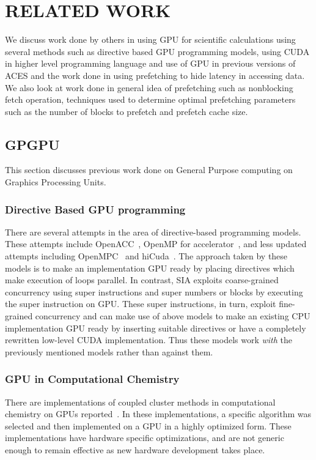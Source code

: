 \chapter{RELATED WORK}\label{lit}

We discuss work done by others in using GPU for scientific calculations using
several methods such as directive based GPU programming models, using CUDA in
higher level programming language and use of GPU in previous versions of ACES
and the work done in using prefetching to hide latency in accessing data. We also look
at work done in general idea of prefetching such as nonblocking fetch operation,
techniques used to determine optimal prefetching parameters such as the number of
blocks to prefetch and prefetch cache size.

\section{GPGPU}
This section discusses previous work done on General Purpose computing on Graphics
Processing Units.

\subsection{Directive Based GPU programming}
There are several attempts in the area of directive-based programming models. These
attempts include OpenACC~\cite{openacc}, OpenMP for
accelerator~\cite{openmpforaccelerators}, and less updated attempts including
OpenMPC~\cite{openmpc} and hiCuda~\cite{hicuda}. The approach taken by these models
is to make an implementation GPU ready by placing directives which make
execution of loops parallel. In contrast, SIA exploits coarse-grained
concurrency using super instructions and super numbers or blocks by executing
the super instruction on GPU. These super instructions, in turn, exploit fine-grained
concurrency and can make use of above models to make an existing CPU implementation
GPU ready by inserting suitable directives or have a completely rewritten low-level
CUDA implementation. Thus these models work \textit{with} the previously mentioned
models rather than against them.

\subsection{GPU in Computational Chemistry}
There are implementations of coupled cluster methods in computational chemistry
on GPUs reported~\cite{bhaskar2013}\cite{deprince2011}\cite{maw2011}. In these
implementations, a specific algorithm was selected and then implemented on a
GPU in a highly optimized form. These implementations have hardware specific
optimizations, and are not generic enough to remain effective as new hardware
development takes place.

